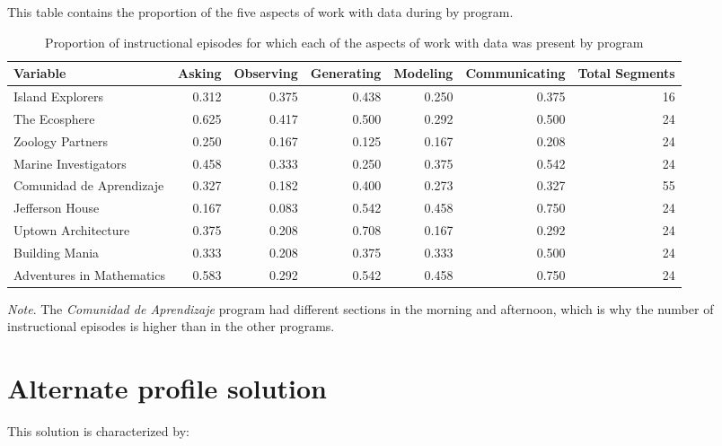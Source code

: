 \documentclass[]{msu-thesis}
\theoremstyle{definition}
\theoremstyle{definition}
\theoremstyle{definition}
\theoremstyle{remark}
\begin{document}
\begin{appendices}
This table contains the proportion of the five aspects of work with data
during by program.

\begin{landscape}\begin{table}

\caption{\label{tab:unnamed-chunk-17}Proportion of instructional episodes for which each of the aspects of work with data was present by program}
\centering
\begin{tabular}[t]{lrrrrrr}
\toprule
Variable & Asking & Observing & Generating & Modeling & Communicating & Total Segments\\
\midrule
Island Explorers & 0.312 & 0.375 & 0.438 & 0.250 & 0.375 & 16\\
The Ecosphere & 0.625 & 0.417 & 0.500 & 0.292 & 0.500 & 24\\
Zoology Partners & 0.250 & 0.167 & 0.125 & 0.167 & 0.208 & 24\\
Marine Investigators & 0.458 & 0.333 & 0.250 & 0.375 & 0.542 & 24\\
Comunidad de Aprendizaje & 0.327 & 0.182 & 0.400 & 0.273 & 0.327 & 55\\
Jefferson House & 0.167 & 0.083 & 0.542 & 0.458 & 0.750 & 24\\
Uptown Architecture & 0.375 & 0.208 & 0.708 & 0.167 & 0.292 & 24\\
Building Mania & 0.333 & 0.208 & 0.375 & 0.333 & 0.500 & 24\\
Adventures in Mathematics & 0.583 & 0.292 & 0.542 & 0.458 & 0.750 & 24\\
\bottomrule
\end{tabular}
\end{table}
\end{landscape}

\emph{Note}. The \emph{Comunidad de Aprendizaje} program had different
sections in the morning and afternoon, which is why the number of
instructional episodes is higher than in the other programs.

\chapter{Alternate profile solution}

This solution is characterized by:


\end{appendices}
\end{document}
